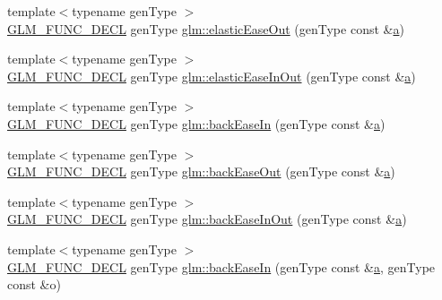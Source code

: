 \begin{DoxyCompactItemize}
\item 
{\footnotesize template$<$typename gen\+Type $>$ }\\\hyperlink{setup_8hpp_ab2d052de21a70539923e9bcbf6e83a51}{G\+L\+M\+\_\+\+F\+U\+N\+C\+\_\+\+D\+E\+CL} gen\+Type \hyperlink{group__gtx__easing_gace9c9d1bdf88bf2ab1e7cdefa54c7365}{glm\+::elastic\+Ease\+Out} (gen\+Type const \&\hyperlink{_s_d_l__opengl__glext_8h_a3309789fc188587d666cda5ece79cf82}{a})
\item 
{\footnotesize template$<$typename gen\+Type $>$ }\\\hyperlink{setup_8hpp_ab2d052de21a70539923e9bcbf6e83a51}{G\+L\+M\+\_\+\+F\+U\+N\+C\+\_\+\+D\+E\+CL} gen\+Type \hyperlink{group__gtx__easing_ga2db4ac8959559b11b4029e54812908d6}{glm\+::elastic\+Ease\+In\+Out} (gen\+Type const \&\hyperlink{_s_d_l__opengl__glext_8h_a3309789fc188587d666cda5ece79cf82}{a})
\item 
{\footnotesize template$<$typename gen\+Type $>$ }\\\hyperlink{setup_8hpp_ab2d052de21a70539923e9bcbf6e83a51}{G\+L\+M\+\_\+\+F\+U\+N\+C\+\_\+\+D\+E\+CL} gen\+Type \hyperlink{group__gtx__easing_ga93cddcdb6347a44d5927cc2bf2570816}{glm\+::back\+Ease\+In} (gen\+Type const \&\hyperlink{_s_d_l__opengl__glext_8h_a3309789fc188587d666cda5ece79cf82}{a})
\item 
{\footnotesize template$<$typename gen\+Type $>$ }\\\hyperlink{setup_8hpp_ab2d052de21a70539923e9bcbf6e83a51}{G\+L\+M\+\_\+\+F\+U\+N\+C\+\_\+\+D\+E\+CL} gen\+Type \hyperlink{group__gtx__easing_gabf25069fa906413c858fd46903d520b9}{glm\+::back\+Ease\+Out} (gen\+Type const \&\hyperlink{_s_d_l__opengl__glext_8h_a3309789fc188587d666cda5ece79cf82}{a})
\item 
{\footnotesize template$<$typename gen\+Type $>$ }\\\hyperlink{setup_8hpp_ab2d052de21a70539923e9bcbf6e83a51}{G\+L\+M\+\_\+\+F\+U\+N\+C\+\_\+\+D\+E\+CL} gen\+Type \hyperlink{group__gtx__easing_gace6d24722a2f6722b56398206eb810bb}{glm\+::back\+Ease\+In\+Out} (gen\+Type const \&\hyperlink{_s_d_l__opengl__glext_8h_a3309789fc188587d666cda5ece79cf82}{a})
\item 
{\footnotesize template$<$typename gen\+Type $>$ }\\\hyperlink{setup_8hpp_ab2d052de21a70539923e9bcbf6e83a51}{G\+L\+M\+\_\+\+F\+U\+N\+C\+\_\+\+D\+E\+CL} gen\+Type \hyperlink{group__gtx__easing_ga33777c9dd98f61d9472f96aafdf2bd36}{glm\+::back\+Ease\+In} (gen\+Type const \&\hyperlink{_s_d_l__opengl__glext_8h_a3309789fc188587d666cda5ece79cf82}{a}, gen\+Type const \&o)

\end{DoxyCompactItemize}
